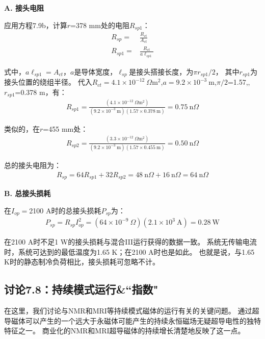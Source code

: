 \textbf{A. 接头电阻}

应用方程7.9b，计算$r$=378 mm处的电阻$R_{sp1}$：
\begin{align*}%
R_{sp}=&\frac{R_{ct}}{A_{ct}}\\\tag{7.9b}
R_{sp1}=&\frac{R_{ct}}{a\ell_{sp1}}
\end{align*}

式中，$a\ell_{sp1}=A_{ct}$，$a$是导体宽度，$\ell_{sp}$是接头搭接长度，为$\pi r_{sp1}/2$，
其中$r_{sp1}$为接头位置的绕组半径。
代入$R_{ct}=4.1\times 10^{-12}\ \Omega\mathrm{ m^2}$,$a=9.2\times 10^{-3}\ \mathrm{m}$,$\pi/2$=1.57,,$r_{sp1}$=0.378 m，有：
\begin{align*}%
R_{sp1}=\frac{(4.1\times 10^{-12}\ \Omega\mathrm{ m^2})}{(9.2\times 10^{-3}\ \mathrm{m})(1.57\times 0.378\ \mathrm{m})}=0.75\ \mathrm{n}\Omega
\end{align*}

类似的，在$r$=455 mm处：
\begin{align*}%
R_{sp2}=\frac{(3.3\times 10^{-12}\ \Omega \mathrm{m^2})}{(9.2\times 10^{-3}\ \mathrm{m})(1.57\times 0.455\ \mathrm{m})}=0.50\ \mathrm{n}\Omega
\end{align*}

总的接头电阻为：
\begin{align*}%
R_{sp}=64R_{sp1}+32R_{sp2}=48\ \mathrm{n}\Omega+16\ \mathrm{n}\Omega=64\ \mathrm{n}\Omega
\end{align*}

\textbf{B. 总接头损耗}

在$I_{op}=$2100 A时的总接头损耗$P_{sp}$为：
\begin{align*}%
P_{sp}=R_{sp}I_{op}^{2}=(64\times 10^{-9}\ \Omega)(2.1\times 10^3\ \mathrm{A})=0.28\ \mathrm{W}\tag{S8.5}
\end{align*}

在2100 A时不足1 W的接头损耗与混合III运行获得的数据一致。
系统无传输电流时，系统可达到的最低温度为1.65 K；在2100 A时也是如此。
也就是说，与1.65 K时的静态制冷负荷相比，接头损耗可忽略不计。


\subsection{讨论7.8：持续模式运行\&``指数"}
在这里，我们讨论与NMR和MRI等持续模式磁体的运行有关的关键问题。
通过超导磁体可以产生的一个远大于永磁体可能产生的持续永恒磁场无疑超导电性的独特特征之一。
商业化的NMR和MRI超导磁体的持续增长清楚地反映了这一点。

